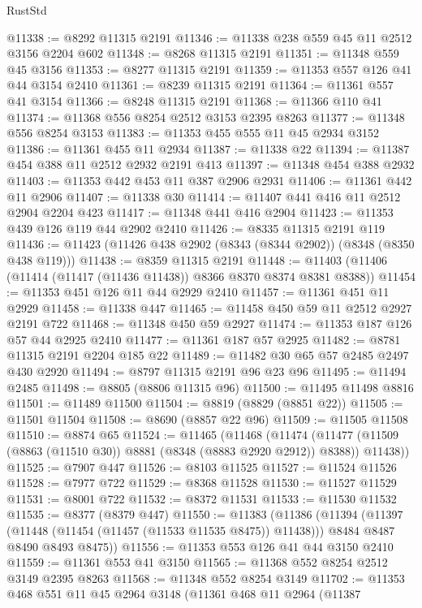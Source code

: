 \begin{lexlean}{RustStd}
\begin{coremodule}
{\begin{coremodule}
{{{{{{{{{{{{{{{{{{{{{{{{{{{{{{{{{{{{{{{{{{{{{{{{{{@11338 := @8292 @11315 @2191
@11346 := @11338 @238 @559 @45 @11 @2512 @3156 @2204 @602
@11348 := @8268 @11315 @2191
@11351 := @11348 @559 @45 @3156
@11353 := @8277 @11315 @2191
@11359 := @11353 @557 @126 @41 @44 @3154 @2410
@11361 := @8239 @11315 @2191
@11364 := @11361 @557 @41 @3154
@11366 := @8248 @11315 @2191
@11368 := @11366 @110 @41
@11374 := @11368 @556 @8254 @2512 @3153 @2395 @8263
@11377 := @11348 @556 @8254 @3153
@11383 := @11353 @455 @555 @11 @45 @2934 @3152
@11386 := @11361 @455 @11 @2934
@11387 := @11338 @22
@11394 := @11387 @454 @388 @11 @2512 @2932 @2191 @413
@11397 := @11348 @454 @388 @2932
@11403 := @11353 @442 @453 @11 @387 @2906 @2931
@11406 := @11361 @442 @11 @2906
@11407 := @11338 @30
@11414 := @11407 @441 @416 @11 @2512 @2904 @2204 @423
@11417 := @11348 @441 @416 @2904
@11423 := @11353 @439 @126 @119 @44 @2902 @2410
@11426 := @8335 @11315 @2191 @119
@11436 := @11423 (@11426 @438 @2902 (@8343 (@8344 @2902)) (@8348 (@8350 @438 @119)))
@11438 := @8359 @11315 @2191
@11448 := @11403 (@11406 (@11414 (@11417 (@11436 @11438)) @8366 @8370 @8374 @8381 @8388))
@11454 := @11353 @451 @126 @11 @44 @2929 @2410
@11457 := @11361 @451 @11 @2929
@11458 := @11338 @447
@11465 := @11458 @450 @59 @11 @2512 @2927 @2191 @722
@11468 := @11348 @450 @59 @2927
@11474 := @11353 @187 @126 @57 @44 @2925 @2410
@11477 := @11361 @187 @57 @2925
@11482 := @8781 @11315 @2191 @2204 @185 @22
@11489 := @11482 @30 @65 @57 @2485 @2497 @430 @2920
@11494 := @8797 @11315 @2191 @96 @23 @96
@11495 := @11494 @2485
@11498 := @8805 (@8806 @11315 @96)
@11500 := @11495 @11498 @8816
@11501 := @11489 @11500
@11504 := @8819 (@8829 (@8851 @22))
@11505 := @11501 @11504
@11508 := @8690 (@8857 @22 @96)
@11509 := @11505 @11508
@11510 := @8874 @65
@11524 := @11465
    (@11468
      (@11474
        (@11477 (@11509 (@8863 (@11510 @30)) @8881 (@8348 (@8883 @2920 @2912)) @8388))
        @11438))
@11525 := @7907 @447
@11526 := @8103 @11525
@11527 := @11524 @11526
@11528 := @7977 @722
@11529 := @8368 @11528
@11530 := @11527 @11529
@11531 := @8001 @722
@11532 := @8372 @11531
@11533 := @11530 @11532
@11535 := @8377 (@8379 @447)
@11550 := @11383
    (@11386
      (@11394
        (@11397 (@11448 (@11454 (@11457 (@11533 @11535 @8475)) @11438)))
        @8484
        @8487
        @8490
        @8493
        @8475))
@11556 := @11353 @553 @126 @41 @44 @3150 @2410
@11559 := @11361 @553 @41 @3150
@11565 := @11368 @552 @8254 @2512 @3149 @2395 @8263
@11568 := @11348 @552 @8254 @3149
@11702 := @11353
    @468
    @551
    @11
    @45
    @2964
    @3148
    (@11361
      @468
      @11
      @2964
      (@11387
}}}}}}}}}}}}}}}}}}}}}}}}}}}}}}}}}}}}}}}}}}}}}}}}}}
\end{coremodule}}
\end{coremodule}
\end{lexlean}
